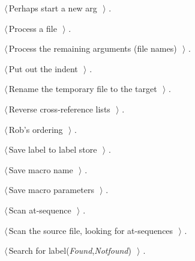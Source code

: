 \documentclass[a4paper]{report}
\begin{document}
{\begin{list}{}{\setlength{\itemsep}{-\parsep}\setlength{\itemindent}{-\leftmargin}}
\item $\langle\,$Perhaps start a new arg\nobreak\ {\footnotesize {}}$\,\rangle$ {\footnotesize {\NWtxtRefIn} .}
\item $\langle\,$Process a file\nobreak\ {\footnotesize {}}$\,\rangle$ {\footnotesize {\NWtxtRefIn} .}
\item $\langle\,$Process the remaining arguments (file names)\nobreak\ {\footnotesize {}}$\,\rangle$ {\footnotesize {\NWtxtRefIn} .}
\item $\langle\,$Put out the indent\nobreak\ {\footnotesize {}}$\,\rangle$ {\footnotesize {\NWtxtRefIn} .
}
\item $\langle\,$Rename the temporary file to the target\nobreak\ {\footnotesize {}}$\,\rangle$ {\footnotesize {\NWtxtRefIn} .
}
\item $\langle\,$Reverse cross-reference lists\nobreak\ {\footnotesize {}}$\,\rangle$ {\footnotesize {\NWtxtRefIn} .}
\item $\langle\,$Rob's ordering\nobreak\ {\footnotesize {}}$\,\rangle$ {\footnotesize {\NWtxtRefIn} .}
\item $\langle\,$Save label to label store\nobreak\ {\footnotesize {}}$\,\rangle$ {\footnotesize {\NWtxtRefIn} .}
\item $\langle\,$Save macro name\nobreak\ {\footnotesize {}}$\,\rangle$ {\footnotesize {\NWtxtRefIn} .}
\item $\langle\,$Save macro parameters\nobreak\ {\footnotesize {}}$\,\rangle$ {\footnotesize {\NWtxtRefIn} .}
\item $\langle\,$Scan at-sequence\nobreak\ {\footnotesize {}}$\,\rangle$ {\footnotesize {\NWtxtRefIn} .}
\item $\langle\,$Scan the source file, looking for at-sequences\nobreak\ {\footnotesize {}}$\,\rangle$ {\footnotesize {\NWtxtRefIn} .}
\item $\langle\,$Search for label(\hbox{\slshape\sffamily Found\/},\hbox{\slshape\sffamily Notfound\/})\nobreak\ {\footnotesize {}}$\,\rangle$ {\footnotesize {\NWtxtRefIn} .
}
\end{list}}
\end{document}
